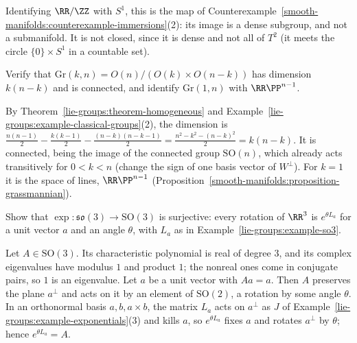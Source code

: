 \begin{solution}
Identifying $\RR/\ZZ$ with $S^1$, this is the map of Counterexample~\ref{smooth-manifolds:counterexample-immersions}(2): its image is a dense subgroup, and not
a submanifold. It is not closed, since it is dense and not all of $T^2$ (it meets the circle $\{0\} \times S^1$ in a countable set).
\end{solution}

\begin{exercise}\label{lie-groups:exercise-grassmannian-dimension}
Verify that $\mathrm{Gr}(k, n) = O(n)/(O(k) \times O(n-k))$ has dimension $k(n-k)$ and is connected, and identify $\mathrm{Gr}(1, n)$ with $\RR\PP^{n-1}$.
\end{exercise}

\begin{solution}
By Theorem~\ref{lie-groups:theorem-homogeneous} and Example~\ref{lie-groups:example-classical-groups}(2), the dimension is
$\frac{n(n - 1)}{2} - \frac{k(k - 1)}{2} - \frac{(n - k)(n - k - 1)}{2} = \frac{n^2 - k^2 - (n - k)^2}{2} = k(n - k)$. It is connected, being the image of the
connected group $\mathrm{SO}(n)$, which already acts transitively for $0 < k < n$ (change the sign of one basis vector of $W^\perp$). For $k = 1$ it is the
space of lines, $\RR\PP^{n-1}$ (Proposition~\ref{smooth-manifolds:proposition-grassmannian}).
\end{solution}

\begin{exercise}\label{lie-groups:exercise-so3-exponential}
Show that $\exp \colon \mathfrak{so}(3) \to \mathrm{SO}(3)$ is surjective: every rotation of $\RR^3$ is $e^{\theta L_a}$ for a unit vector $a$ and an angle
$\theta$, with $L_a$ as in Example~\ref{lie-groups:example-so3}.
\end{exercise}

\begin{solution}
Let $A \in \mathrm{SO}(3)$. Its characteristic polynomial is real of degree $3$, and its complex eigenvalues have modulus $1$ and product $1$; the nonreal ones come
in conjugate pairs, so $1$ is an eigenvalue. Let $a$ be a unit vector with $Aa = a$. Then $A$ preserves the plane $a^\perp$ and acts on it by an element of
$\mathrm{SO}(2)$, a rotation by some angle $\theta$. In an orthonormal basis $a, b, a \times b$, the matrix $L_a$ acts on $a^\perp$ as $J$ of
Example~\ref{lie-groups:example-exponentials}(3) and kills $a$, so $e^{\theta L_a}$ fixes $a$ and rotates $a^\perp$ by $\theta$; hence $e^{\theta L_a} = A$.
\end{solution}

